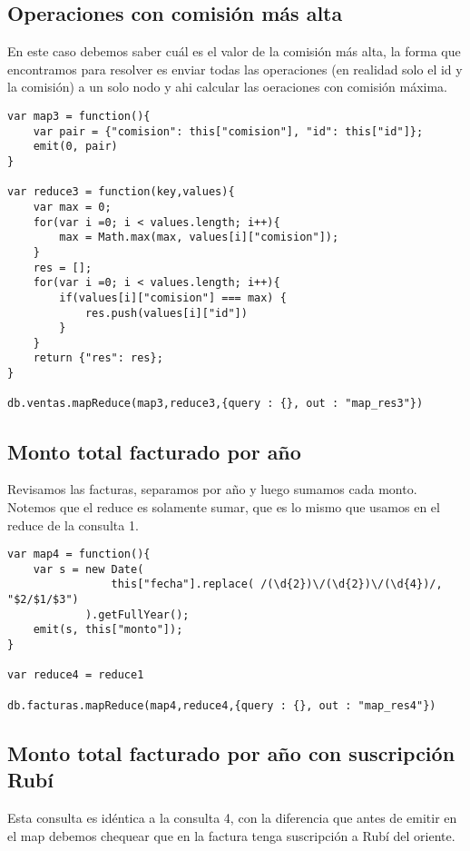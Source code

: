 \subsection{Operaciones con comisión más alta}

En este caso debemos saber cuál es el valor de la comisión más alta, la forma que encontramos para resolver es enviar todas las operaciones (en realidad solo el id y la comisión) a un solo nodo y ahi calcular las oeraciones con comisión máxima.

\begin{verbatim}
var map3 = function(){
    var pair = {"comision": this["comision"], "id": this["id"]};
    emit(0, pair)
}

var reduce3 = function(key,values){
    var max = 0;
    for(var i =0; i < values.length; i++){
        max = Math.max(max, values[i]["comision"]);
    }
    res = [];
    for(var i =0; i < values.length; i++){
        if(values[i]["comision"] === max) {
            res.push(values[i]["id"])
        }
    }	
    return {"res": res};
}

db.ventas.mapReduce(map3,reduce3,{query : {}, out : "map_res3"})
\end{verbatim}

\subsection{Monto total facturado por año}

Revisamos las facturas, separamos por año y luego sumamos cada monto. Notemos que el reduce es solamente sumar, que es lo mismo que usamos en el reduce de la consulta 1.

\begin{verbatim}
var map4 = function(){
    var s = new Date(
                this["fecha"].replace( /(\d{2})\/(\d{2})\/(\d{4})/, "$2/$1/$3")
            ).getFullYear();
    emit(s, this["monto"]);
}

var reduce4 = reduce1

db.facturas.mapReduce(map4,reduce4,{query : {}, out : "map_res4"})
\end{verbatim}

\subsection{Monto total facturado por año con suscripción Rubí}

Esta consulta es idéntica a la consulta 4, con la diferencia que antes de emitir en el map debemos chequear que en la factura tenga suscripción a Rubí del oriente.

